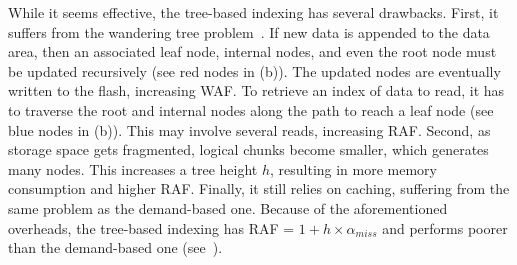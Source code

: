 While it seems effective, the tree-based indexing has several drawbacks. 
First, it suffers from the wandering tree problem~\cite{wandering-b+}.
If new data is appended to the data area, 
then an associated leaf node, internal nodes, 
and even the root node must be
updated recursively (see red nodes in (b)). 
The updated nodes are
eventually written to the flash, increasing WAF. 
To retrieve an index of data to read, 
it has to traverse the root and internal nodes 
along the path to reach a
leaf node (see blue nodes in (b)). 
This may involve several reads, increasing RAF.
Second, 
as storage space gets fragmented, logical chunks become smaller,
which generates many nodes.
This increases a tree height $h$, resulting in more memory consumption
and higher RAF.
Finally, it still
relies on caching, suffering from the same problem as the demand-based one.
Because of the aforementioned overheads,
the tree-based indexing has RAF = $1 + h \times \alpha_{miss}$
and performs poorer than the demand-based one (see~).


